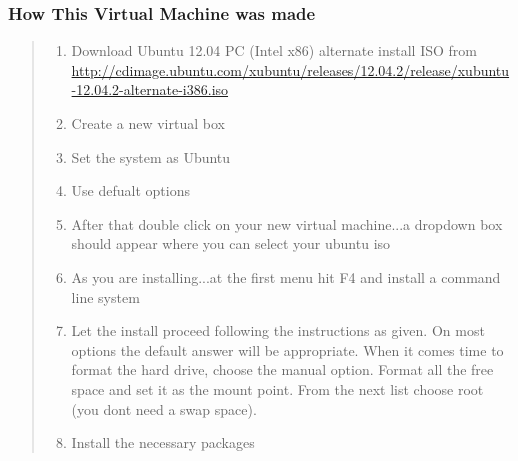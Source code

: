 \documentclass[letterpaper,10pt,english]{sphinxmanual}
\begin{document}
\subsubsection{How This Virtual Machine was made}
\label{2013/vm:how-this-virtual-machine-was-made}\begin{quote}
\begin{enumerate}
\item {} 
Download Ubuntu 12.04 PC (Intel x86) alternate install ISO from
\url{http://cdimage.ubuntu.com/xubuntu/releases/12.04.2/release/xubuntu-12.04.2-alternate-i386.iso}

\item {} 
Create a new virtual box

\item {} 
Set the system as Ubuntu

\item {} 
Use defualt options

\item {} 
After that double click on your new virtual machine...a dropdown
box should appear where you can select
your ubuntu iso

\item {} 
As you are installing...at the first menu hit F4 and install a
command line system

\item {} 
Let the install proceed following the instructions as given. On most
options the default answer will be appropriate.
When it comes time to format the hard drive, choose the manual option.
Format all the free space and set it as the mount
point. From the next list choose root (you dont need a swap space).

\item {} 
Install the necessary packages


\end{enumerate}
\end{quote}
\end{document}
